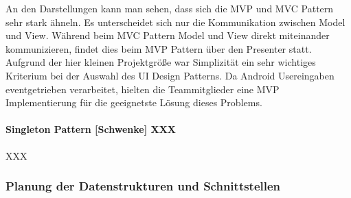 
An den Darstellungen kann man sehen, dass sich die MVP und MVC Pattern sehr stark ähneln. Es unterscheidet sich nur die Kommunikation zwischen Model und View. Während beim MVC Pattern Model und View direkt miteinander kommunizieren, findet dies beim MVP Pattern über den Presenter statt. Aufgrund der hier kleinen Projektgröße war Simplizität ein sehr wichtiges Kriterium bei der Auswahl des UI Design Patterns. Da Android Usereingaben eventgetrieben verarbeitet, hielten die Teammitglieder eine MVP Implementierung für die geeignetste Lösung dieses Problems.

\clearpage

\paragraph{Singleton Pattern [Schwenke] XXX}

XXX

\clearpage

\subsubsection{Planung der Datenstrukturen und Schnittstellen}


\enlargethispage{3\baselineskip}

